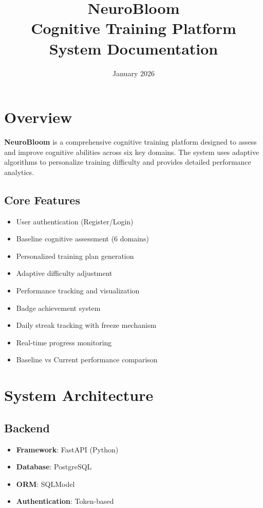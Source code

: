 \documentclass[12pt,a4paper]{article}
\title{\textbf{NeuroBloom\\Cognitive Training Platform}\\System Documentation}
\author{}
\date{January 2026}
\begin{document}
\maketitle
\tableofcontents
\newpage

\section{Overview}

\textbf{NeuroBloom} is a comprehensive cognitive training platform designed to assess and improve cognitive abilities across six key domains. The system uses adaptive algorithms to personalize training difficulty and provides detailed performance analytics.

\subsection{Core Features}

\begin{itemize}
    \item User authentication (Register/Login)
    \item Baseline cognitive assessment (6 domains)
    \item Personalized training plan generation
    \item Adaptive difficulty adjustment
    \item Performance tracking and visualization
    \item Badge achievement system
    \item Daily streak tracking with freeze mechanism
    \item Real-time progress monitoring
    \item Baseline vs Current performance comparison
\end{itemize}

\section{System Architecture}

\subsection{Backend}
\begin{itemize}
    \item \textbf{Framework}: FastAPI (Python)
    \item \textbf{Database}: PostgreSQL
    \item \textbf{ORM}: SQLModel
    \item \textbf{Authentication}: Token-based
\end{itemize}
\end{document}
